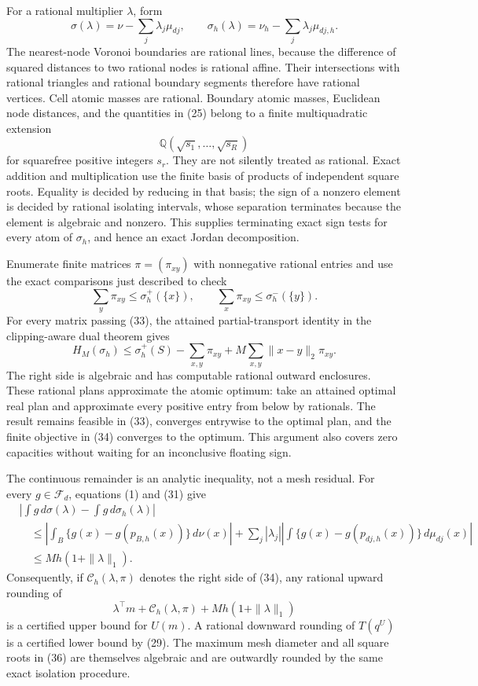 For a rational multiplier \(\lambda\), form
\[
 \sigma(\lambda)=\nu-\sum_j\lambda_j\mu_{dj},
 \qquad
 \sigma_h(\lambda)=\nu_h-\sum_j\lambda_j\mu_{dj,h}.        \tag{31}
\]
The nearest-node Voronoi boundaries are rational lines, because the difference
of squared distances to two rational nodes is rational affine.  Their
intersections with rational triangles and rational boundary segments therefore
have rational vertices.  Cell atomic masses are rational.  Boundary atomic
masses, Euclidean node distances, and the quantities in (25) belong to a finite
multiquadratic extension
\[
 \mathbb Q(\sqrt{s_1},\ldots,\sqrt{s_R})                    \tag{32}
\]
for squarefree positive integers \(s_r\).  They are not silently treated as
rational.  Exact addition and multiplication use the finite basis of products
of independent square roots.  Equality is decided by reducing in that basis;
the sign of a nonzero element is decided by rational isolating intervals,
whose separation terminates because the element is algebraic and nonzero.
This supplies terminating exact sign tests for every atom of \(\sigma_h\), and
hence an exact Jordan decomposition.

Enumerate finite matrices \(\pi=(\pi_{xy})\) with nonnegative rational entries
and use the exact comparisons just described to check
\[
 \sum_y\pi_{xy}\le\sigma_h^+(\{x\}),
 \qquad
 \sum_x\pi_{xy}\le\sigma_h^-(\{y\}).                       \tag{33}
\]
For every matrix passing (33), the attained partial-transport identity in the
clipping-aware dual theorem gives
\[
 H_M(\sigma_h)
 \le \sigma_h^+(S)-\sum_{x,y}\pi_{xy}
      +M\sum_{x,y}\|x-y\|_2\pi_{xy}.                        \tag{34}
\]
The right side is algebraic and has computable rational outward enclosures.
These rational plans approximate the atomic optimum: take an attained optimal
real plan and approximate every positive entry from below by rationals.  The
result remains feasible in (33), converges entrywise to the optimal plan, and
the finite objective in (34) converges to the optimum.  This argument also
covers zero capacities without waiting for an inconclusive floating sign.

The continuous remainder is an analytic inequality, not a mesh residual.  For
every \(g\in\mathcal F_d\), equations (1) and (31) give
\begin{align}
 &\left|\int g\,d\sigma(\lambda)-\int g\,d\sigma_h(\lambda)\right|\\
 &\quad\le
 \left|\int_B\{g(x)-g(p_{B,h}(x))\}\,d\nu(x)\right|
 +\sum_j|\lambda_j|
   \left|\int\{g(x)-g(p_{dj,h}(x))\}\,d\mu_{dj}(x)\right|\\
 &\quad\le Mh(1+\|\lambda\|_1).                            \tag{35}
\end{align}
Consequently, if \(\mathcal C_h(\lambda,\pi)\) denotes the right side of (34), any
rational upward rounding of
\[
 \lambda^\top m+\mathcal C_h(\lambda,\pi)+Mh(1+\|\lambda\|_1)\tag{36}
\]
is a certified upper bound for \(U(m)\).  A rational downward rounding of
\(T(q^U)\) is a certified lower bound by (29).  The maximum mesh diameter and
all square roots in (36) are themselves algebraic and are outwardly rounded by
the same exact isolation procedure.

